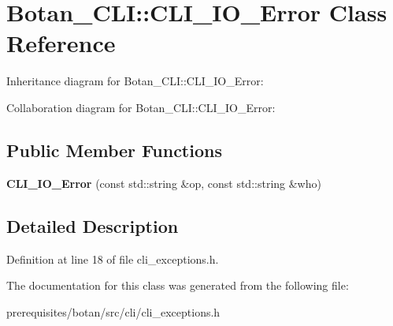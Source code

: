 \hypertarget{class_botan___c_l_i_1_1_c_l_i___i_o___error}{}\section{Botan\+\_\+\+C\+LI\+:\+:C\+L\+I\+\_\+\+I\+O\+\_\+\+Error Class Reference}
\label{class_botan___c_l_i_1_1_c_l_i___i_o___error}


Inheritance diagram for Botan\+\_\+\+C\+LI\+:\+:C\+L\+I\+\_\+\+I\+O\+\_\+\+Error\+:


Collaboration diagram for Botan\+\_\+\+C\+LI\+:\+:C\+L\+I\+\_\+\+I\+O\+\_\+\+Error\+:
\subsection*{Public Member Functions}
\begin{DoxyCompactItemize}
\item 
\mbox{\label{class_botan___c_l_i_1_1_c_l_i___i_o___error_a881f58a087bb411da0b4c1913743e807}} 
{\bfseries C\+L\+I\+\_\+\+I\+O\+\_\+\+Error} (const std\+::string \&op, const std\+::string \&who)
\end{DoxyCompactItemize}


\subsection{Detailed Description}


Definition at line 18 of file cli\+\_\+exceptions.\+h.



The documentation for this class was generated from the following file\+:\begin{DoxyCompactItemize}
\item 
prerequisites/botan/src/cli/cli\+\_\+exceptions.\+h\end{DoxyCompactItemize}
